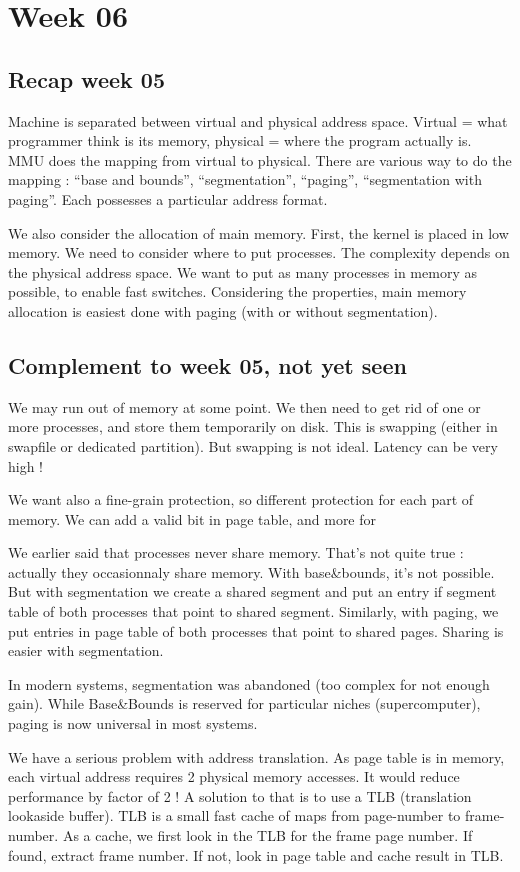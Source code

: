 \documentclass[12pt,a4paper]{article}
\begin{document}
\section{Week 06}
\subsection{Recap week 05}
Machine is separated between virtual and physical address space. Virtual = what programmer think is its memory, physical = where the program actually is. MMU does the mapping from virtual to physical. There are various way to do the mapping : ``base and bounds'', ``segmentation'', ``paging'', ``segmentation with paging''. Each possesses a particular address format. 

We also consider the allocation of main memory. First, the kernel is placed in low memory. We need to consider where to put processes. The complexity depends on the physical address space. We want to put as many processes in memory as possible, to enable fast switches. Considering the properties, main memory allocation is easiest done with paging (with or without segmentation). 
\subsection{Complement to week 05, not yet seen}
We may run out of memory at some point. We then need to get rid of one or more processes, and store them temporarily on disk. This is swapping (either in swapfile or dedicated partition). But swapping is not ideal. Latency can be very high !

We want also a fine-grain protection, so different protection for each part of memory. We can add a valid bit in page table, and more for 

We earlier said that processes never share memory. That's not quite true : actually they occasionnaly share memory. With base\&bounds, it's not possible. But with segmentation we create a shared segment and put an entry if segment table of both processes that point to shared segment. Similarly, with paging, we put entries in page table of both processes that point to shared pages. Sharing is easier with segmentation. 

In modern systems, segmentation was abandoned (too complex for not enough gain). While Base\&Bounds is reserved for particular niches (supercomputer), paging is now universal in most systems. 

We have a serious problem with address translation. As page table is in memory, each virtual address requires 2 physical memory accesses. It would reduce performance by factor of 2 ! A solution to that is to use a TLB (translation lookaside buffer). TLB is a small fast cache of maps from page-number to frame-number. As a cache, we first look in the TLB for the frame page number. If found, extract frame number. If not, look in page table and cache result in TLB. 
\end{document}
